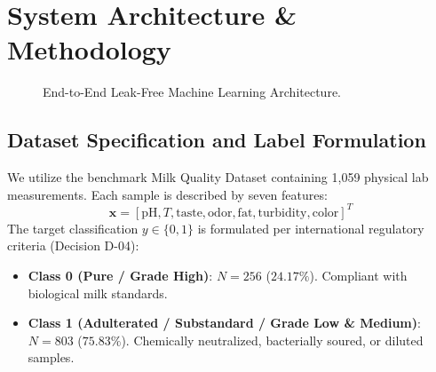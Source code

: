 \documentclass[conference]{IEEEtran}
\begin{document}
\section{System Architecture \& Methodology}

\begin{figure}[htbp]
\centering
{}
\caption{End-to-End Leak-Free Machine Learning Architecture.}
\label{fig:architecture}
\end{figure}

\subsection{Dataset Specification and Label Formulation}
We utilize the benchmark Milk Quality Dataset containing 1,059 physical lab measurements. Each sample is described by seven features:
\begin{equation}
\mathbf{x} = [\text{pH}, T, \text{taste}, \text{odor}, \text{fat}, \text{turbidity}, \text{color}]^T
\end{equation}
The target classification $y \in \{0, 1\}$ is formulated per international regulatory criteria (Decision D-04):
\begin{itemize}
    \item \textbf{Class 0 (Pure / Grade High)}: $N=256$ ($24.17\%$). Compliant with biological milk standards.
    \item \textbf{Class 1 (Adulterated / Substandard / Grade Low \& Medium)}: $N=803$ ($75.83\%$). Chemically neutralized, bacterially soured, or diluted samples.
\end{itemize}
\end{document}
